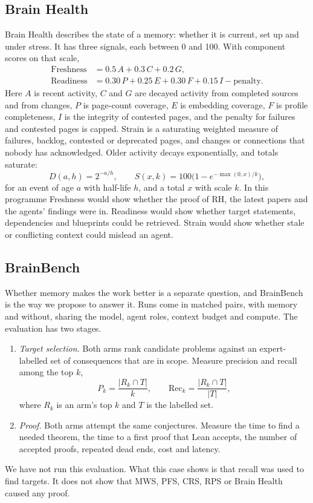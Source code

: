 \documentclass[11pt]{amsart}
\begin{document}
\subsection*{Brain Health} Brain Health describes the state of a memory: whether it is current, set up and under stress. It has three signals, each between 0 and 100. With component scores on that scale,
\begin{align*}
\text{Freshness}&=0.5\,A+0.3\,C+0.2\,G,\\
\text{Readiness}&=0.30\,P+0.25\,E+0.30\,F+0.15\,I-\text{penalty}.
\end{align*}
Here $A$ is recent activity, $C$ and $G$ are decayed activity from completed sources and from changes, $P$ is page-count coverage, $E$ is embedding coverage, $F$ is profile completeness, $I$ is the integrity of contested pages, and the penalty for failures and contested pages is capped. Strain is a saturating weighted measure of failures, backlog, contested or deprecated pages, and changes or connections that nobody has acknowledged. Older activity decays exponentially, and totals saturate:
\[
D(a,h)=2^{-a/h},\qquad S(x,k)=100\bigl(1-e^{-\max(0,x)/k}\bigr),
\]
for an event of age $a$ with half-life $h$, and a total $x$ with scale $k$. In this programme Freshness would show whether the proof of RH, the latest papers and the agents' findings were in. Readiness would show whether target statements, dependencies and blueprints could be retrieved. Strain would show whether stale or conflicting context could mislead an agent.

\subsection*{BrainBench} Whether memory makes the work better is a separate question, and BrainBench is the way we propose to answer it. Runs come in matched pairs, with memory and without, sharing the model, agent roles, context budget and compute. The evaluation has two stages.
\begin{enumerate}
\item \emph{Target selection.} Both arms rank candidate problems against an expert-labelled set of consequences that are in scope. Measure precision and recall among the top $k$,
\[
P_k=\frac{|R_k\cap T|}{k},\qquad \mathrm{Rec}_k=\frac{|R_k\cap T|}{|T|},
\]
where $R_k$ is an arm's top $k$ and $T$ is the labelled set.
\item \emph{Proof.} Both arms attempt the same conjectures. Measure the time to find a needed theorem, the time to a first proof that Lean accepts, the number of accepted proofs, repeated dead ends, cost and latency.
\end{enumerate}
We have not run this evaluation. What this case shows is that recall was used to find targets. It does not show that MWS, PFS, CRS, RPS or Brain Health caused any proof.
\end{document}
